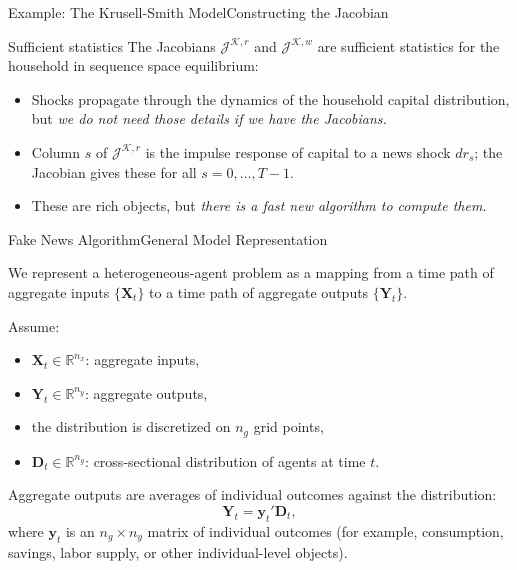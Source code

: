 \documentclass[aspectratio=169]{beamer}
\begin{document}
\begin{frame}{Example: The Krusell-Smith Model}{Constructing the Jacobian}
    \begin{alertblock}{Sufficient statistics}
        The Jacobians $\mathcal{J}^{\mathcal{K},r}$ and $\mathcal{J}^{\mathcal{K},w}$ are sufficient statistics for the household in sequence space equilibrium:
        \begin{itemize}
            \item Shocks propagate through the dynamics of the household capital distribution, but\emph{ we do not need those details if we have the Jacobians.}
            \item Column $s$ of $\mathcal{J}^{\mathcal{K},r}$ is \alert{the impulse response of capital to a news shock $dr_s$}; the Jacobian gives these for all $s=0,\ldots,T-1$.
            \item These are rich objects, but \emph{there is a fast new algorithm to compute them.}
        \end{itemize}
    \end{alertblock}
\end{frame}

\begin{frame}{Fake News Algorithm}{General Model Representation}

    We represent a heterogeneous-agent problem as a mapping from a time path of
    aggregate inputs $\{\bm{X}_t\}$ to a time path of aggregate outputs $\{\bm{Y}_t\}$.

    \vspace{0.5em}

    Assume:
    \begin{itemize}
        \item $\bm{X}_t \in \mathbb{R}^{n_x}$: aggregate inputs,
        \item $\bm{Y}_t \in \mathbb{R}^{n_y}$: aggregate outputs,
        \item the distribution is discretized on $n_g$ grid points,
        \item $\bm{D}_t \in \mathbb{R}^{n_g}$: cross-sectional distribution of agents at time $t$.
    \end{itemize}

    \vspace{0.5em}

    Aggregate outputs are averages of individual outcomes against the distribution:
    \[
        \bm{Y}_t = \bm{y}_t' \bm{D}_t,
    \]
    where $\bm{y}_t$ is an $n_g \times n_y$ matrix of individual outcomes
    (for example, consumption, savings, labor supply, or other individual-level objects).
\end{frame}
\end{document}
